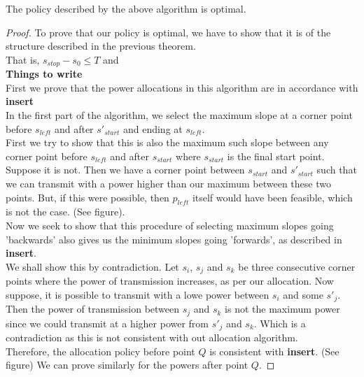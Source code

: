 \begin{theorem}

\end{theorem}

































\begin{theorem}
The policy described by the above algorithm is optimal.
\end{theorem}
\begin{proof}
To prove that our policy is optimal, we have to show that it is of the structure described in the previous theorem. \\
That is, $s_{stop} - s_0 \leq T$ and \\
\textbf{Things to write}\\
First we prove that the power allocations in this algorithm are in accordance with \textbf{insert}\\
In the first part of the algorithm, we select the maximum slope at a corner point before $s_{left}$ and after $s'_{start}$ and ending at $s_{left}$. \\
First we try to show that this is also the maximum such slope between any corner point before $s_{left}$ and after $s_{start}$ where $s_{start}$ is the final start point. \\
Suppose it is not. Then we have a corner point between $s_{start}$ and $s'_{start}$ such that we can transmit with a power higher than our maximum between these two points. But, if this were possible, then 
$p_{left}$ itself would have been feasible, which is not the case. (See figure).\\
Now we seek to show that this procedure of selecting maximum slopes going 'backwards' also gives us the minimum slopes going 'forwards', as described in \textbf{insert}.\\
We shall show this by contradiction. Let $s_i$, $s_j$ and $s_k$ be three consecutive corner points where the power of transmission increases, as per our allocation. Now suppose, it is possible to transmit with a lowe power between $s_i$ and some $s'_j$. 
Then the power of transmission between $s_j$ and $s_k$ is not the maximum power since we could transmit at a higher power from $s'_j$ and $s_k$. Which is a contradiction as this is not consistent with out allocation algorithm.\\
Therefore, the allocation policy before point $Q$ is consistent with \textbf{insert}. (See figure)
We can prove similarly for the powers after point $Q$.
\end{proof}




